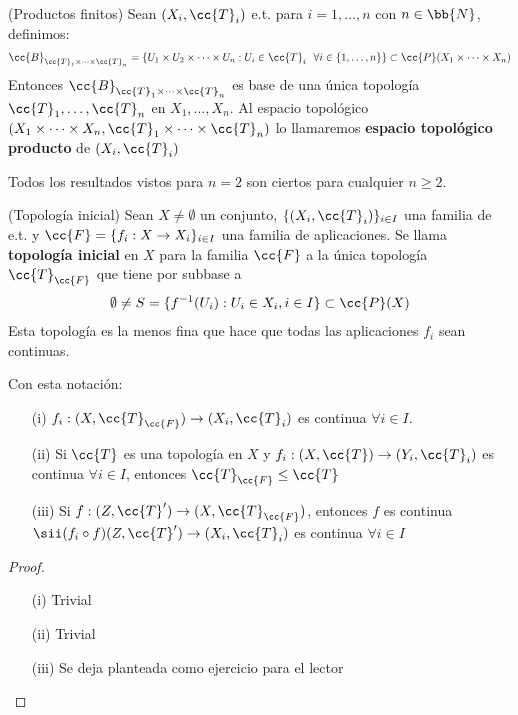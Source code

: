 \begin{definicion}
    (Productos finitos) Sean $(X_i, \cc{T}_i)$ e.t. para $i=1,\dots,n$ con $n\in \bb{N}$, definimos:
    \begin{align*}
        \cc{B}_{\cc{T}_1 \times \dots \times \cc{T}_n}= \{U_1 \times U_2 \times \dots \times U_n : U_i \in \cc{T}_i\ \ \forall i \in\{1,\dots,n\} \} \subset \cc{P}(X_1 \times \dots \times X_n)
    \end{align*}
    Entonces $\cc{B}_{\cc{T}_1 \times \dots \times \cc{T}_n}$ es base de una única topología $\cc{T}_1, \dots, \cc{T}_n$ en $X_1, \dots, X_n$. Al espacio topológico $(X_1\times \dots \times X_n, \cc{T}_1 \times \dots \times \cc{T}_n)$ lo llamaremos \textbf{espacio topológico producto} de $(X_i, \cc{T}_i)$
    \endsquare
\end{definicion}

\begin{observacion}
    Todos los resultados vistos para $n=2$ son ciertos para cualquier $n\geq 2$.
    \endsquare
\end{observacion}

\begin{definicion}
    (Topología inicial) Sean $X\neq \emptyset$ un conjunto, $\{(X_i, \cc{T}_i)\}_{i\in I}$ una familia de e.t. y $\cc{F}=\{f_i:X \to X_i\}_{i\in I}$ una familia de aplicaciones. Se llama \textbf{topología inicial} en $X$ para la familia $\cc{F}$ a la única topología $\cc{T}_{\cc{F}}$ que tiene por subbase a 
    \begin{gather*}
        \emptyset \neq S = \{f^{-1}(U_i) : U_i \in X_i, i\in I\} \subset \cc{P}(X)
    \end{gather*}
    Esta topología es la menos fina que hace que todas las aplicaciones $f_i$ sean continuas. 
    \endsquare
\end{definicion}

\begin{prop}
    Con esta notación:
    \begin{enumerate}
        \item[(i)] $f_i:(X, \cc{T}_{\cc{F}}) \to (X_i, \cc{T}_i)$ es continua $\forall i \in I$.
        \item[(ii)] Si $\cc{T}$ es una topología en $X$ y $f_i:(X, \cc{T})\to (Y_i, \cc{T}_i)$ es continua $\forall i\in I$, entonces $\cc{T}_{\cc{F}}\leq \cc{T}$
        \item[(iii)] Si $f:(Z, \cc{T}')\to (X, \cc{T}_{\cc{F}})$, entonces $f$ es continua $\sii (f_i\circ f)(Z, \cc{T}') \to (X_i, \cc{T}_i)$ es continua $\forall i \in I$
    \end{enumerate}
    \begin{proof}\
        \begin{enumerate}
            \item[(i)] Trivial
            \item[(ii)] Trivial
            \item[(iii)] Se deja planteada como ejercicio para el lector %
        \end{enumerate}
    \end{proof}
\end{prop}


